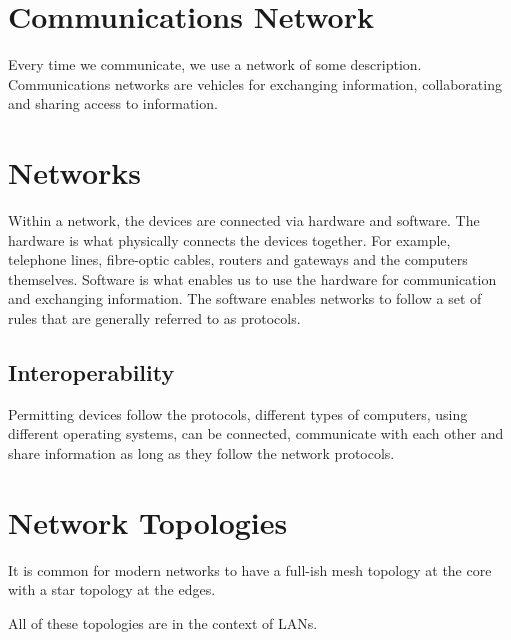 
\section*{Communications Network}
Every time we communicate, we use a network of some description. Communications networks are vehicles for exchanging information, collaborating and sharing access to information. 

\section*{Networks}

Within a network, the devices are connected via hardware and software. The hardware is what physically connects the devices together. For example, telephone lines, fibre-optic cables, routers and gateways and the computers themselves. Software is what enables us to use the hardware for communication and exchanging information. The software enables networks to follow a set of rules that are generally referred to as protocols.
\subsection*{Interoperability}
Permitting devices follow the protocols, different types of computers, using different operating systems, can be connected, communicate with each other and share information as long as they follow the network protocols.

\section*{Network Topologies}

It is common for modern networks to have a full-ish mesh topology at the core with a star topology at the edges.

All of these topologies are in the context of LANs.

